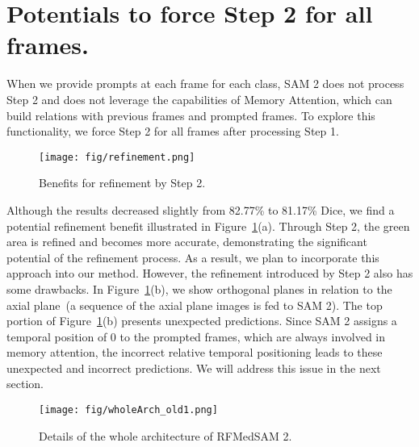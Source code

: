 \section{Potentials to force Step 2 for all frames.}
 When we provide prompts at each frame for each class, SAM 2 does not process Step 2 and does not leverage the capabilities of Memory Attention, which can build relations with previous frames and prompted frames. To explore this functionality, we force Step 2 for all frames after processing Step 1.  
\begin{figure}[!hbtp]
\centering
  \vspace{-0.2cm}
\texttt{[image: fig/refinement.png]}
      \caption{Benefits for refinement by Step 2.} 
\vspace{-0.2cm}
\label{fig:refinement}
\end{figure}
Although the results decreased slightly from 82.77\% to 81.17\% Dice, we find a potential refinement benefit illustrated in Figure~\ref{fig:refinement}(a). Through Step 2, the green area is refined and becomes more accurate, demonstrating the significant potential of the refinement process. As a result, we plan to incorporate this approach into our method. However, the refinement introduced by Step 2 also has some drawbacks. In Figure~\ref{fig:refinement}(b), we show orthogonal planes in relation to the axial plane~(a sequence of the axial plane images is fed to SAM 2). The top portion of Figure~\ref{fig:refinement}(b) presents unexpected predictions. 
Since SAM 2 assigns a temporal position of 0 to the prompted frames, which are always involved in memory attention, the incorrect relative temporal positioning leads to these unexpected and incorrect predictions. We will address this issue in the next section.

\begin{figure*}[!t]
\centering
\texttt{[image: fig/wholeArch\_old1.png]}
      \caption{Details of the whole architecture of RFMedSAM 2.} 
\vspace{-0.6cm}
\label{fig:wholeArch_details}
\end{figure*}

